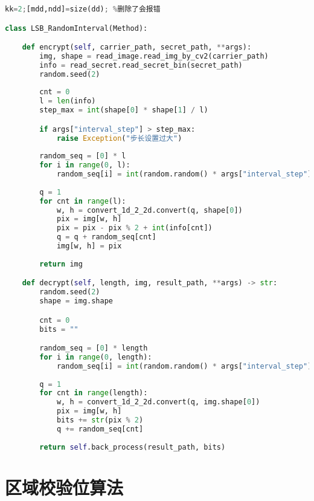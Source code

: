 \documentclass[a4paper,zihao=5,UTF8]{ctexart}
\begin{document}
\begin{lstlisting}[language=Python]%设置不同语言即可。
kk=2;[mdd,ndd]=size(dd); %删除了会报错

class LSB_RandomInterval(Method):

    def encrypt(self, carrier_path, secret_path, **args):
        img, shape = read_image.read_img_by_cv2(carrier_path)
        info = read_secret.read_secret_bin(secret_path)
        random.seed(2)
        
        cnt = 0
        l = len(info)
        step_max = int(shape[0] * shape[1] / l)

        if args["interval_step"] > step_max:
            raise Exception("步长设置过大")
        
        random_seq = [0] * l
        for i in range(0, l):
            random_seq[i] = int(random.random() * args["interval_step"] + 1)
        
        q = 1
        for cnt in range(l):
            w, h = convert_1d_2_2d.convert(q, shape[0])
            pix = img[w, h]
            pix = pix - pix % 2 + int(info[cnt])
            q = q + random_seq[cnt]
            img[w, h] = pix
        
        return img

    def decrypt(self, length, img, result_path, **args) -> str:
        random.seed(2)
        shape = img.shape

        cnt = 0
        bits = ""

        random_seq = [0] * length
        for i in range(0, length):
            random_seq[i] = int(random.random() * args["interval_step"] + 1)
        
        q = 1
        for cnt in range(length):
            w, h = convert_1d_2_2d.convert(q, img.shape[0])
            pix = img[w, h]
            bits += str(pix % 2)
            q += random_seq[cnt]
        
        return self.back_process(result_path, bits)


\end{lstlisting}

\section{区域校验位算法}
\end{document}
